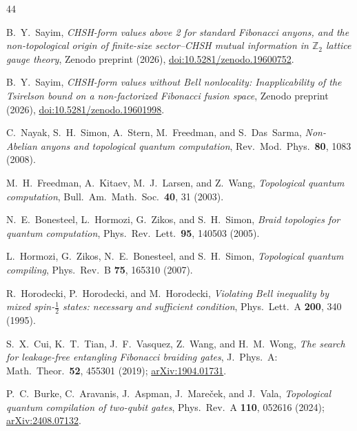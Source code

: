 \documentclass[aps,pra,twocolumn,superscriptaddress,longbibliography,floatfix,nofootinbib]{revtex4-2}
\begin{document}

\begin{thebibliography}{44}

B.~Y.~Sayim,
\emph{CHSH-form values above 2 for standard Fibonacci anyons, and the
non-topological origin of finite-size sector--CHSH mutual information in
$\mathbb{Z}_2$ lattice gauge theory},
Zenodo preprint (2026),
\href{https://doi.org/10.5281/zenodo.19600752}{doi:10.5281/zenodo.19600752}.

B.~Y.~Sayim,
\emph{CHSH-form values without Bell nonlocality: Inapplicability of the
Tsirelson bound on a non-factorized Fibonacci fusion space},
Zenodo preprint (2026),
\href{https://doi.org/10.5281/zenodo.19601998}{doi:10.5281/zenodo.19601998}.

C.~Nayak, S.~H.~Simon, A.~Stern, M.~Freedman, and S.~Das~Sarma,
\emph{Non-Abelian anyons and topological quantum computation},
Rev.\ Mod.\ Phys.\ \textbf{80}, 1083 (2008).

M.~H.~Freedman, A.~Kitaev, M.~J.~Larsen, and Z.~Wang,
\emph{Topological quantum computation},
Bull.\ Am.\ Math.\ Soc.\ \textbf{40}, 31 (2003).

N.~E.~Bonesteel, L.~Hormozi, G.~Zikos, and S.~H.~Simon,
\emph{Braid topologies for quantum computation},
Phys.\ Rev.\ Lett.\ \textbf{95}, 140503 (2005).

L.~Hormozi, G.~Zikos, N.~E.~Bonesteel, and S.~H.~Simon,
\emph{Topological quantum compiling},
Phys.\ Rev.\ B \textbf{75}, 165310 (2007).

R.~Horodecki, P.~Horodecki, and M.~Horodecki,
\emph{Violating Bell inequality by mixed spin-$\frac{1}{2}$
states: necessary and sufficient condition},
Phys.\ Lett.\ A \textbf{200}, 340 (1995).

S.~X.~Cui, K.~T.~Tian, J.~F.~Vasquez, Z.~Wang, and H.~M.~Wong,
\emph{The search for leakage-free entangling Fibonacci braiding gates},
J.\ Phys.\ A: Math.\ Theor.\ \textbf{52}, 455301 (2019);
\href{https://arxiv.org/abs/1904.01731}{arXiv:1904.01731}.

P.~C.~Burke, C.~Aravanis, J.~Aspman, J.~Mare\v{c}ek, and J.~Vala,
\emph{Topological quantum compilation of two-qubit gates},
Phys.\ Rev.\ A \textbf{110}, 052616 (2024);
\href{https://arxiv.org/abs/2408.07132}{arXiv:2408.07132}.


\end{thebibliography}
\end{document}
